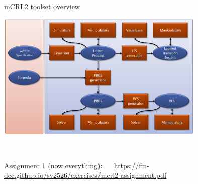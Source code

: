 \documentclass[aspectratio=169]{beamer}
\begin{document}
\begin{slide}{mCRL2 toolset overview}
  \centering
  
  \includegraphics[width=0.75\textwidth]{images/mcrl2-toolset.png}
  
  \\[-10mm]
  \begin{block}{}\centering
    Assignment 1 (now everything): ~~
  \mbox{\alert{\footnotesize\url{https://fm-dcc.github.io/sv2526/exercises/mcrl2-assignment.pdf}}}

  \end{block}
\end{slide}
\end{document}
